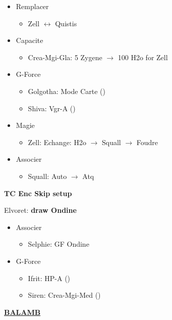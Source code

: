 \begin{menu}
	\begin{itemize}
		\item Remplacer
			\begin{itemize}
				\item Zell $\leftrightarrow$ Quistis
			\end{itemize}
		\item Capacite
			\begin{itemize}
				\item Crea-Mgi-Gla: 5 Zygene $\rightarrow$ 100 H2o for Zell
			\end{itemize}
		\item G-Force
			\begin{itemize}
				\item Golgotha: Mode Carte ()
				\item Shiva: Vgr-A ()
			\end{itemize}
		\item Magie
			\begin{itemize}
				\item Zell: Echange: H2o $\rightarrow$ Squall $\rightarrow$ Foudre
			\end{itemize}
		\item Associer
			\begin{itemize}
				\item Squall: Auto $\rightarrow$ Atq
			\end{itemize}
	\end{itemize}
\end{menu}

\textbf{TC Enc Skip setup}

Elvoret: \textbf{draw Ondine}

\begin{menu}
	\begin{itemize}
		\item Associer
			\begin{itemize}
				\item Selphie: GF Ondine
			\end{itemize}
		\item G-Force
			\begin{itemize}
				\item Ifrit: HP-A ()
				\item Siren: Crea-Mgi-Med ()
			\end{itemize}
	\end{itemize}
\end{menu}

\underline{\textbf{BALAMB}}

